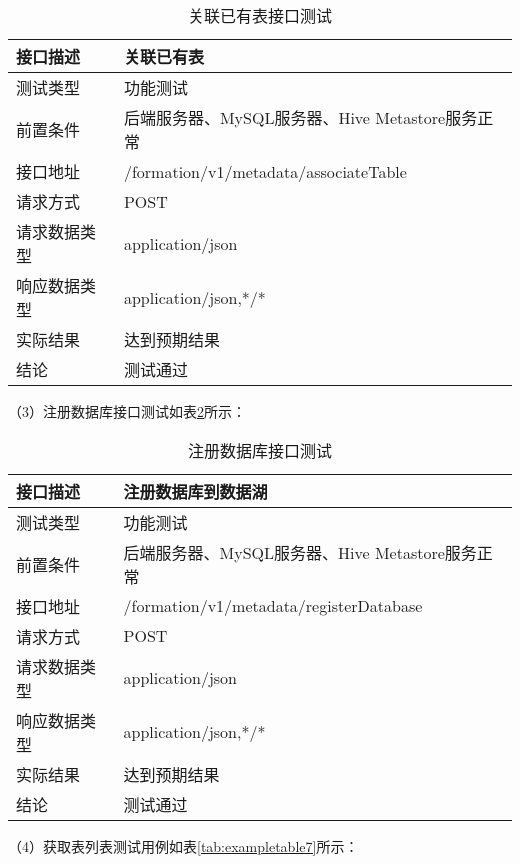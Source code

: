 \begin{table}[H]
  \centering
  \caption{关联已有表接口测试}
  \label{tab:exampletable5}
  \begin{tabular}{ll}
    \toprule
    接口描述         & 关联已有表         \\
    \midrule
    测试类型         & 功能测试         \\
    前置条件         & 后端服务器、MySQL服务器、Hive Metastore服务正常         \\
    接口地址       & /formation/v1/metadata/associateTable        \\
    请求方式         & POST      \\
    请求数据类型         & application/json     \\
    响应数据类型         & application/json,*/*           \\
    实际结果         & 达到预期结果           \\
    结论            & 测试通过           \\
    \bottomrule
  \end{tabular}
\end{table}

（3）注册数据库接口测试如表\ref{tab:exampletable6}所示：

\begin{table}[H]
  \centering
  \caption{注册数据库接口测试}
  \label{tab:exampletable6}
  \begin{tabular}{ll}
    \toprule
    接口描述         & 注册数据库到数据湖         \\
    \midrule
    测试类型         & 功能测试         \\
    前置条件         & 后端服务器、MySQL服务器、Hive Metastore服务正常         \\
    接口地址       & /formation/v1/metadata/registerDatabase        \\
    请求方式         & POST      \\
    请求数据类型         & application/json     \\
    响应数据类型         & application/json,*/*           \\
    实际结果         & 达到预期结果           \\
    结论            & 测试通过           \\
    \bottomrule
  \end{tabular}
\end{table}

（4）获取表列表测试用例如表\ref{tab:exampletable7}所示：

